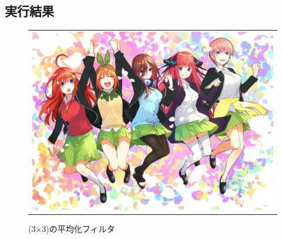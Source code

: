 \documentclass[a4paper,11pt,titlepage]{bxjsarticle}
\begin{document}
\subsection{実行結果}
\begin{figure}[htpb]
  \centering
    \begin{tabular}{c}
 
 
      \begin{minipage}{0.47\hsize}
        \centering
          \includegraphics[keepaspectratio, scale=0.07, angle=0]
                          {output5_1.jpg}
                          \caption{(3×3)の平均化フィルタ}
                          \label{fig:sin_x}
      \end{minipage}
 
 
      \begin{minipage}{0.06\hsize}
        \hspace{2mm}
      \end{minipage}
 
 

\end{tabular}
\end{figure}
\end{document}
